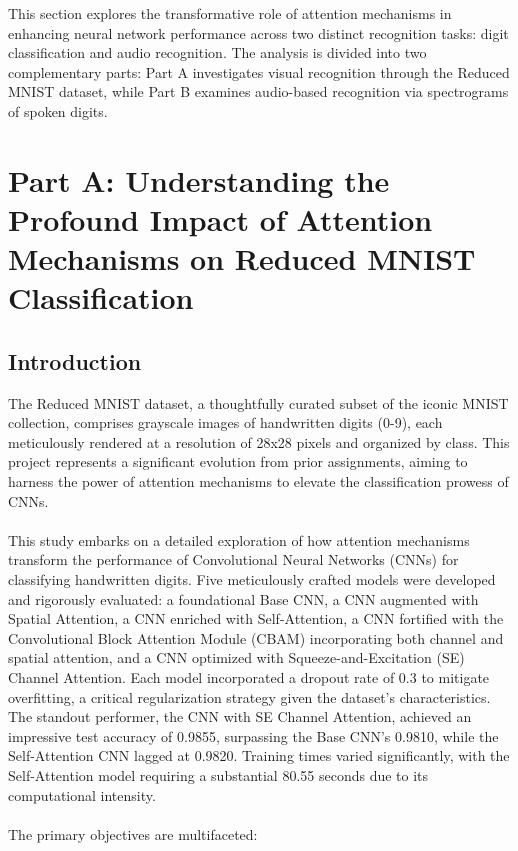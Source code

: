 \documentclass[12pt]{article}
\begin{document}
This section explores the transformative role of attention mechanisms in enhancing neural network performance across two distinct recognition tasks: digit classification and audio recognition. The analysis is divided into two complementary parts: Part A investigates visual recognition through the Reduced MNIST dataset, while Part B examines audio-based recognition via spectrograms of spoken digits. 

\section{Part A: Understanding the Profound Impact of Attention Mechanisms on Reduced MNIST Classification}

\subsection{Introduction}
The Reduced MNIST dataset, a thoughtfully curated subset of the iconic MNIST collection, comprises grayscale images of handwritten digits (0-9), each meticulously rendered at a resolution of 28x28 pixels and organized by class. This project represents a significant evolution from prior assignments, aiming to harness the power of attention mechanisms to elevate the classification prowess of CNNs. \\
\\
This study embarks on a detailed exploration of how attention mechanisms transform the performance of Convolutional Neural Networks (CNNs) for classifying handwritten digits. Five meticulously crafted models were developed and rigorously evaluated: a foundational Base CNN, a CNN augmented with Spatial Attention, a CNN enriched with Self-Attention, a CNN fortified with the Convolutional Block Attention Module (CBAM) incorporating both channel and spatial attention, and a CNN optimized with Squeeze-and-Excitation (SE) Channel Attention. Each model incorporated a dropout rate of 0.3 to mitigate overfitting, a critical regularization strategy given the dataset's characteristics. The standout performer, the CNN with SE Channel Attention, achieved an impressive test accuracy of 0.9855, surpassing the Base CNN's 0.9810, while the Self-Attention CNN lagged at 0.9820. Training times varied significantly, with the Self-Attention model requiring a substantial 80.55 seconds due to its computational intensity.\\
\\
The primary objectives are multifaceted:
\end{document}
